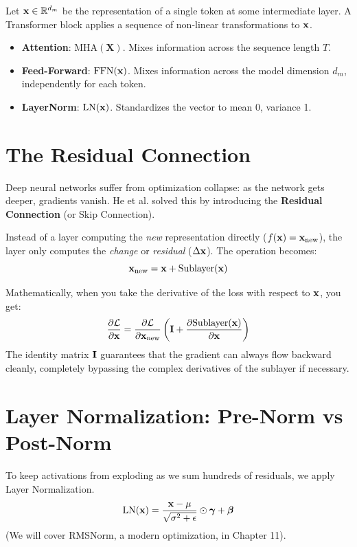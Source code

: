 Let $\mathbf{x} \in \mathbb{R}^{d_m}$ be the representation of a single token at some intermediate layer.
A Transformer block applies a sequence of non-linear transformations to $\mathbf{x}$.
\begin{itemize}
    \item \textbf{Attention}: $\text{MHA}(\mathbf{X})$. Mixes information across the sequence length $T$.
    \item \textbf{Feed-Forward}: $\text{FFN}(\mathbf{x})$. Mixes information across the model dimension $d_m$, independently for each token.
    \item \textbf{LayerNorm}: $\text{LN}(\mathbf{x})$. Standardizes the vector to mean 0, variance 1.
\end{itemize}

\section{The Residual Connection}
\label{ch:10:sec:main}

Deep neural networks suffer from optimization collapse: as the network gets deeper, gradients vanish. He et al. solved this by introducing the \textbf{Residual Connection} (or Skip Connection). 

Instead of a layer computing the \emph{new} representation directly ($f(\mathbf{x}) = \mathbf{x}_{\text{new}}$), the layer only computes the \emph{change} or \emph{residual} ($\Delta \mathbf{x}$). The operation becomes:
\begin{equation}
\mathbf{x}_{\text{new}} = \mathbf{x} + \text{Sublayer}(\mathbf{x})
\end{equation}

Mathematically, when you take the derivative of the loss with respect to $\mathbf{x}$, you get:
\begin{equation}
\frac{\partial \mathcal{L}}{\partial \mathbf{x}} = \frac{\partial \mathcal{L}}{\partial \mathbf{x}_{\text{new}}} \left( \mathbf{I} + \frac{\partial \text{Sublayer}(\mathbf{x})}{\partial \mathbf{x}} \right)
\end{equation}
The identity matrix $\mathbf{I}$ guarantees that the gradient can always flow backward cleanly, completely bypassing the complex derivatives of the sublayer if necessary. 

\section{Layer Normalization: Pre-Norm vs Post-Norm}

To keep activations from exploding as we sum hundreds of residuals, we apply Layer Normalization. 
\begin{equation}
\text{LN}(\mathbf{x}) = \frac{\mathbf{x} - \mu}{\sqrt{\sigma^2 + \epsilon}} \odot \boldsymbol{\gamma} + \boldsymbol{\beta}
\end{equation}
(We will cover RMSNorm, a modern optimization, in Chapter 11).

